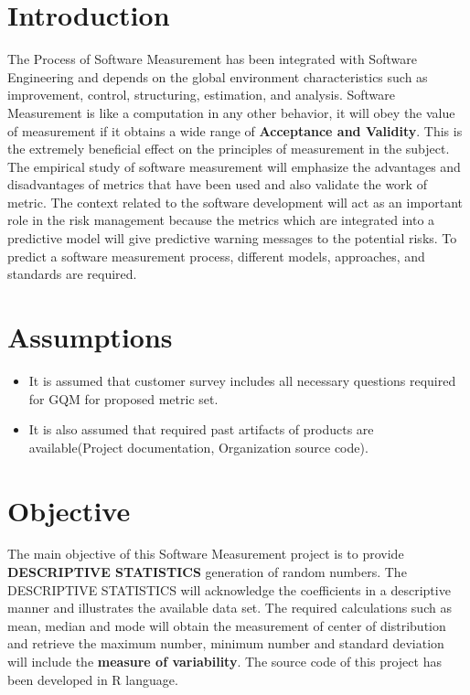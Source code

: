 \documentclass[a4paper, 11pt]{article}
\begin{document}
\newpage
\tableofcontents
\listoffigures
\listoftables

\newpage
\section{Introduction}
The Process of Software Measurement has been integrated with Software Engineering and depends on the global environment characteristics such as improvement, control, structuring, estimation, and analysis. Software Measurement is like a computation in any other behavior, it will obey the value of measurement if it obtains a wide range of \textbf{Acceptance and Validity}. This is the extremely beneficial effect on the principles of measurement in the subject. The empirical study of software measurement will emphasize the advantages and disadvantages of metrics that have been used and also validate the work of metric. The context related to the software development will act as an important role in the risk management because the metrics which are integrated into a predictive model will give predictive warning messages to the potential risks. To predict a software measurement process, different models, approaches, and standards are required. \\

\section{Assumptions}
\begin{itemize}
\item It is assumed that customer survey includes all necessary questions required for GQM for proposed metric set.
\item It is also assumed that required past artifacts of products are available(Project documentation, Organization source code).
\end{itemize}



\section{Objective}
The main objective of this Software Measurement project is to provide \textbf{DESCRIPTIVE STATISTICS}\cite{1} generation of random numbers. The DESCRIPTIVE STATISTICS will acknowledge the coefficients in a descriptive manner and illustrates the available data set. The required calculations such as mean, median and mode will obtain the measurement of center of distribution and retrieve the maximum number, minimum number and standard deviation will include the \textbf{measure of variability}. The source code of this project has been developed in R language.
\end{document}
